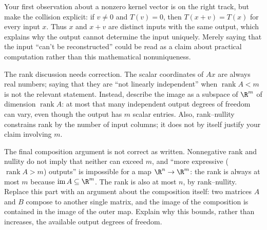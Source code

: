 \begin{feedback}[\cref{ex:la-12}]
Your first observation about a nonzero kernel vector is on the right
track, but make the collision explicit: if $v\ne0$ and $T(v)=0$, then
$T(x+v)=T(x)$ for every input $x$. Thus $x$ and $x+v$ are distinct inputs
with the same output, which explains why the output cannot determine the
input uniquely. Merely saying that the input ``can't be reconstructed''
could be read as a claim about practical computation rather than this
mathematical nonuniqueness.

The rank discussion needs correction. The scalar coordinates of $Ax$ are
always real numbers; saying that they are ``not linearly independent''
when $\operatorname{rank}A<m$ is not the relevant statement. Instead,
describe the image as a subspace of $\R^m$ of dimension
$\operatorname{rank}A$: at most that many independent output degrees of
freedom can vary, even though the output has $m$ scalar entries. Also,
rank--nullity constrains rank by the number of input columns; it does not
by itself justify your claim involving $m$.

The final composition argument is not correct as written. Nonnegative
rank and nullity do not imply that neither can exceed $m$, and
``more expressive ($\operatorname{rank}A>m$) outputs'' is impossible
for a map $\R^n\to\R^m$: the rank is always at most $m$ because
$\operatorname{im}A\subseteq\R^m$. The rank is also at most $n$, by
rank--nullity. Replace this part with an argument about the composition
itself: two matrices $A$ and $B$ compose to another single matrix, and
the image of the composition is contained in the image of the outer map.
Explain why this bounds, rather than increases, the available output
degrees of freedom.
\end{feedback}
